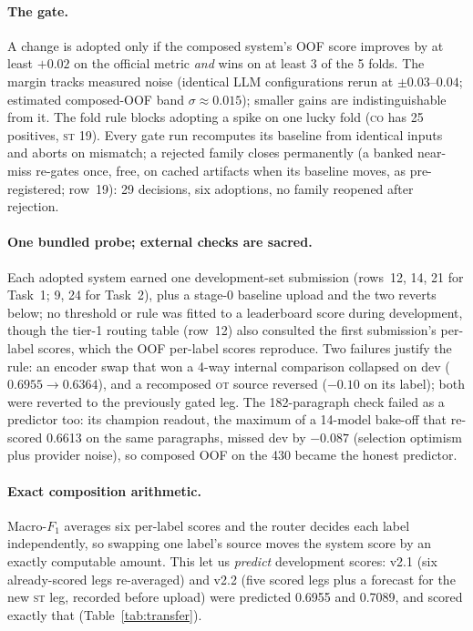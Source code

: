 \documentclass[11pt]{article}
\newcommand{\lab}[1]{\textsc{#1}}
\newcommand{\co}{\lab{co}}
\newcommand{\st}{\lab{st}}
\newcommand{\ot}{\lab{ot}}
\begin{document}
\paragraph{The gate.} A change is adopted only if the composed system's
OOF score improves by at least $+0.02$ on the official metric \emph{and}
wins on at least 3 of the 5 folds. The margin tracks measured noise
(identical LLM configurations rerun at $\pm0.03$--$0.04$; estimated
composed-OOF band $\sigma{\approx}0.015$); smaller gains are
indistinguishable from it. The fold rule blocks adopting a spike on one
lucky fold (\co{} has 25 positives, \st{} 19). Every gate run
recomputes its baseline from identical inputs and aborts on mismatch;
a rejected family closes permanently (a banked near-miss re-gates
once, free, on cached artifacts when its baseline moves, as
pre-registered; row~19): 29 decisions, six adoptions, no family
reopened after rejection.

\paragraph{One bundled probe; external checks are sacred.} Each adopted
system earned one development-set submission (rows~12, 14, 21 for
Task~1; 9, 24 for Task~2), plus a stage-0 baseline upload and the two
reverts below; no threshold or rule was fitted to a leaderboard score
during development, though the tier-1 routing table (row~12) also
consulted the first submission's per-label scores, which the OOF
per-label scores reproduce. Two failures justify the rule: an encoder
swap that won a 4-way internal comparison collapsed on dev
($0.6955{\rightarrow}0.6364$), and a recomposed \ot{} source reversed
($-0.10$ on its label); both were reverted to the previously gated
leg. The 182-paragraph check failed as a predictor too: its champion
readout, the maximum of a 14-model bake-off that re-scored 0.6613 on
the same paragraphs, missed dev by $-0.087$ (selection optimism plus
provider noise), so composed OOF on the 430 became the honest
predictor.

\paragraph{Exact composition arithmetic.} Macro-$F_1$ averages six
per-label scores and the router decides each label independently, so
swapping one label's source moves the system score by an exactly
computable amount. This let us \emph{predict} development scores: v2.1
(six already-scored legs re-averaged) and v2.2 (five scored legs plus
a forecast for the new \st{} leg, recorded before upload) were
predicted 0.6955 and 0.7089, and scored exactly that
(Table~\ref{tab:transfer}).
\end{document}
